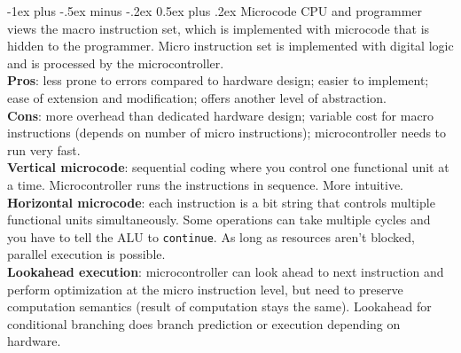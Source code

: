 \documentclass[10pt,landscape]{article}
\makeatletter
\renewcommand{\section}{\@startsection{section}{1}{0mm}%
                                {-1ex plus -.5ex minus -.2ex}%
                                {0.5ex plus .2ex}%
                                {\normalfont\scriptsize\bfseries}}
\makeatother
\begin{document}
\begin{multicols}{3}
\section{Microcode}
CPU and programmer views the macro instruction set, which is implemented with microcode that is hidden to the programmer. Micro instruction set is implemented with digital logic and is processed by the microcontroller.\\
\textbf{Pros}: less prone to errors compared to hardware design; easier to implement; ease of extension and modification; offers another level of abstraction.\\
\textbf{Cons}: more overhead than dedicated hardware design; variable cost for macro instructions (depends on number of micro instructions); microcontroller needs to run very fast.\\
\textbf{Vertical microcode}: sequential coding where you control one functional unit at a time. Microcontroller runs the instructions in sequence. More intuitive.\\
\textbf{Horizontal microcode}: each instruction is a bit string that controls multiple functional units simultaneously. Some operations can take multiple cycles and you have to tell the ALU to \texttt{continue}. As long as resources aren't blocked, parallel execution is possible.\\
\textbf{Lookahead execution}: microcontroller can look ahead to next instruction and perform optimization at the micro instruction level, but need to preserve computation semantics (result of computation stays the same). Lookahead for conditional branching does branch prediction or execution depending on hardware.

\end{multicols}
\end{document}
